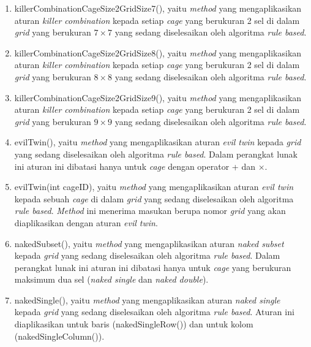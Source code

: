 \begin{enumerate}
\item killerCombinationCageSize2GridSize7(), yaitu \textit{method} yang mengaplikasikan aturan \textit{killer combination} kepada setiap \textit{cage} yang berukuran 2 sel di dalam \textit{grid} yang berukuran \begin{math}7 \times 7\end{math} yang sedang diselesaikan oleh algoritma \textit{rule based}.
\item killerCombinationCageSize2GridSize8(), yaitu \textit{method} yang mengaplikasikan aturan \textit{killer combination} kepada setiap \textit{cage} yang berukuran 2 sel di dalam \textit{grid} yang berukuran \begin{math}8 \times 8\end{math} yang sedang diselesaikan oleh algoritma \textit{rule based}.
\item killerCombinationCageSize2GridSize9(), yaitu \textit{method} yang mengaplikasikan aturan \textit{killer combination} kepada setiap \textit{cage} yang berukuran 2 sel di dalam \textit{grid} yang berukuran \begin{math}9 \times 9\end{math} yang sedang diselesaikan oleh algoritma \textit{rule based}.
\item evilTwin(), yaitu \textit{method} yang mengaplikasikan aturan \textit{evil twin} kepada \textit{grid} yang sedang diselesaikan oleh algoritma \textit{rule based}. Dalam perangkat lunak ini aturan ini dibatasi hanya untuk \textit{cage} dengan operator + dan \begin{math}\times\end{math}.
\item evilTwin(int cageID), yaitu \textit{method} yang mengaplikasikan aturan \textit{evil twin} kepada sebuah \textit{cage} di dalam \textit{grid} yang sedang diselesaikan oleh algoritma \textit{rule based}. \textit{Method} ini menerima masukan berupa nomor \textit{grid} yang akan diaplikasikan dengan aturan \textit{evil twin}.
\item nakedSubset(), yaitu \textit{method} yang mengaplikasikan aturan \textit{naked subset} kepada \textit{grid} yang sedang diselesaikan oleh algoritma \textit{rule based}. Dalam perangkat lunak ini aturan ini dibatasi hanya untuk \textit{cage} yang berukuran maksimum dua sel (\textit{naked single} dan \textit{naked double}).
\item nakedSingle(), yaitu \textit{method} yang mengaplikasikan aturan \textit{naked single} kepada \textit{grid} yang sedang diselesaikan oleh algoritma \textit{rule based}. Aturan ini diaplikasikan untuk baris (nakedSingleRow()) dan untuk kolom (nakedSingleColumn()).

\end{enumerate}
